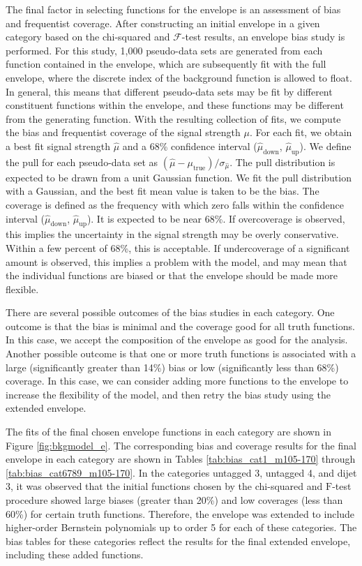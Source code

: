 The final factor in selecting functions for the envelope is an assessment of bias and frequentist coverage. 
After constructing an initial envelope in a given 
category based on the chi-squared and $\mathcal{F}$-test results, an envelope bias study is performed. 
For this study, 1,000 pseudo-data sets are generated from each function contained in the envelope, which are subsequently fit with the full envelope, where 
the discrete index of the background function is allowed to float. 
In general, this means that different pseudo-data sets may be fit by different 
constituent functions within the envelope, and these functions may be different from the generating function. 
With the resulting collection of fits, we compute the bias and frequentist coverage of the signal strength $\mu$. 
For each fit, we obtain a best fit signal strength $\hat{\mu}$ and a 68\% confidence interval
($\hat{\mu}_{\mathrm{down}}$, $\hat{\mu}_{\mathrm{up}}$). We define the pull for each pseudo-data set as 
$(\hat{\mu}-\mu_{\mathrm{true}})/\sigma_{\hat{\mu}}$. 
The pull distribution is expected to be drawn from a unit Gaussian function. 
We fit the pull distribution with a Gaussian, and the best fit mean 
value is taken to be the bias. The coverage is defined as the frequency with which zero falls
within the confidence interval ($\hat{\mu}_{\mathrm{down}}$, $\hat{\mu}_{\mathrm{up}}$). It is expected to be 
near 68\%. If overcoverage is observed, this implies the uncertainty in the signal strength may 
be overly conservative. Within a few percent of 68\%, this is acceptable. If undercoverage of 
a significant amount is observed, this implies a problem with the model, and may mean that 
the individual functions are biased or that the envelope should be made more flexible. 

There are several possible outcomes of the bias studies in each 
category. One outcome is that the bias is minimal and the coverage good for all 
truth functions. In this case, we accept the composition of the envelope as good 
for the analysis. Another possible outcome is that one or more truth functions is 
associated with a large (significantly greater than 14\%) bias or low 
(significantly less than 68\%) coverage. In this case, we can consider adding 
more functions to the envelope to increase the flexibility of the model, and then 
retry the bias study using the extended envelope. 

The fits of the final chosen envelope functions in each category are shown in Figure \ref{fig:bkgmodel_e}.
The corresponding bias and coverage results for the final envelope in each category 
are shown in Tables \ref{tab:bias_cat1_m105-170} through \ref{tab:bias_cat6789_m105-170}. 
In the categories untagged 3, untagged 4, and dijet 3, it was observed that the initial functions chosen 
by the chi-squared and $\mathrm{F}$-test procedure showed large biases (greater than 20\%) and low coverages (less than 60\%) for 
certain truth functions. Therefore, the envelope was extended to include higher-order Bernstein polynomials up 
to order 5 for each of these categories. The bias tables for these categories reflect the results for the final 
extended envelope, including these added functions. 

